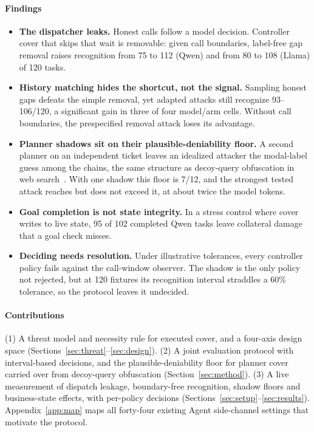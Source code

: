 \paragraph{Findings}
\begin{itemize}
\item \textbf{The dispatcher leaks.} Honest calls follow a model decision. Controller cover that skips that wait is removable: given call boundaries, label-free gap removal raises recognition from 75 to 112 (Qwen) and from 80 to 108 (Llama) of 120 tasks.
\item \textbf{History matching hides the shortcut, not the signal.} Sampling honest gaps defeats the simple removal, yet adapted attacks still recognize 93--106/120, a significant gain in three of four model/arm cells. Without call boundaries, the prespecified removal attack loses its advantage.
\item \textbf{Planner shadows sit on their plausible-deniability floor.} A second planner on an independent ticket leaves an idealized attacker the modal-label guess among the chains, the same structure as decoy-query obfuscation in web search~\cite{domingoferrer2009goopir}. With one shadow this floor is 7/12, and the strongest tested attack reaches but does not exceed it, at about twice the model tokens.
\item \textbf{Goal completion is not state integrity.} In a stress control where cover writes to live state, 95 of 102 completed Qwen tasks leave collateral damage that a goal check misses.
\item \textbf{Deciding needs resolution.} Under illustrative tolerances, every controller policy fails against the call-window observer. The shadow is the only policy not rejected, but at 120 fixtures its recognition interval straddles a 60\% tolerance, so the protocol leaves it undecided.
\end{itemize}

\paragraph{Contributions}
(1) A threat model and necessity rule for executed cover, and a four-axis design space (Sections~\ref{sec:threat}--\ref{sec:design}). (2) A joint evaluation protocol with interval-based decisions, and the plausible-deniability floor for planner cover carried over from decoy-query obfuscation (Section~\ref{sec:method}). (3) A live measurement of dispatch leakage, boundary-free recognition, shadow floors and business-state effects, with per-policy decisions (Sections~\ref{sec:setup}--\ref{sec:results}). Appendix~\ref{app:map} maps all forty-four existing Agent side-channel settings that motivate the protocol.
